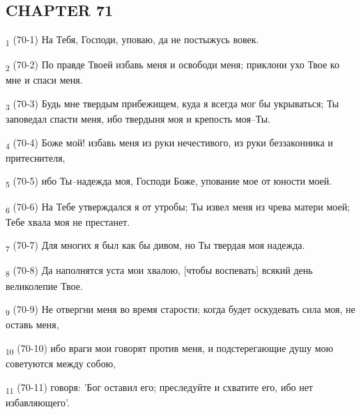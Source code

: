 \subsection{CHAPTER 71}
\begin{tcolorbox}
\textsubscript{1} (70-1) На Тебя, Господи, уповаю, да не постыжусь вовек.
\end{tcolorbox}
\begin{tcolorbox}
\textsubscript{2} (70-2) По правде Твоей избавь меня и освободи меня; приклони ухо Твое ко мне и спаси меня.
\end{tcolorbox}
\begin{tcolorbox}
\textsubscript{3} (70-3) Будь мне твердым прибежищем, куда я всегда мог бы укрываться; Ты заповедал спасти меня, ибо твердыня моя и крепость моя--Ты.
\end{tcolorbox}
\begin{tcolorbox}
\textsubscript{4} (70-4) Боже мой! избавь меня из руки нечестивого, из руки беззаконника и притеснителя,
\end{tcolorbox}
\begin{tcolorbox}
\textsubscript{5} (70-5) ибо Ты--надежда моя, Господи Боже, упование мое от юности моей.
\end{tcolorbox}
\begin{tcolorbox}
\textsubscript{6} (70-6) На Тебе утверждался я от утробы; Ты извел меня из чрева матери моей; Тебе хвала моя не престанет.
\end{tcolorbox}
\begin{tcolorbox}
\textsubscript{7} (70-7) Для многих я был как бы дивом, но Ты твердая моя надежда.
\end{tcolorbox}
\begin{tcolorbox}
\textsubscript{8} (70-8) Да наполнятся уста мои хвалою, [чтобы воспевать] всякий день великолепие Твое.
\end{tcolorbox}
\begin{tcolorbox}
\textsubscript{9} (70-9) Не отвергни меня во время старости; когда будет оскудевать сила моя, не оставь меня,
\end{tcolorbox}
\begin{tcolorbox}
\textsubscript{10} (70-10) ибо враги мои говорят против меня, и подстерегающие душу мою советуются между собою,
\end{tcolorbox}
\begin{tcolorbox}
\textsubscript{11} (70-11) говоря: 'Бог оставил его; преследуйте и схватите его, ибо нет избавляющего'.
\end{tcolorbox}
